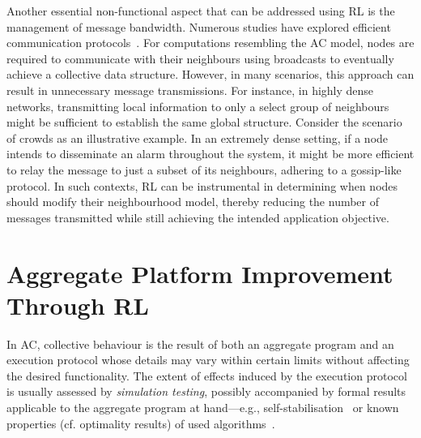{Another essential non-functional aspect that can be addressed using \ac{RL} is the management of message bandwidth. 
 Numerous studies have explored efficient communication protocols~\cite{DBLP:conf/nips/ZhangZL19, su2019cooperative}. 
 For computations resembling the AC model, nodes are required to communicate with their neighbours using broadcasts to eventually achieve a collective data structure. 
 However, in many scenarios, this approach can result in unnecessary message transmissions. 
 For instance, in highly dense networks, transmitting local information to only a select group of neighbours might be sufficient to establish the same global structure.
%
Consider the scenario of crowds as an illustrative example. 
 In an extremely dense setting, if a node intends to disseminate an alarm throughout the system, 
 it might be more efficient to relay the message to just a subset of its neighbours, 
 adhering to a gossip-like protocol.
In such contexts, \ac{RL} can be instrumental in determining 
 when nodes should modify their neighbourhood model, 
 thereby reducing the number of messages transmitted 
 while still achieving the intended application objective.
}
\section{Aggregate Platform Improvement Through \acl{RL}}\label{acsos2022:sec:contribution}
In \ac{AC}, collective behaviour 
 is the result of both
 an aggregate program
 and an execution protocol
 whose details may vary within certain limits
 without affecting the desired functionality.
%
The extent of effects induced by the execution protocol
 is usually assessed by \emph{simulation testing},
 possibly accompanied by formal results applicable to the aggregate program at hand---e.g., self-stabilisation~\cite{DBLP:journals/tomacs/ViroliABDP18}
  or known properties (cf. optimality results) of used algorithms~\cite{DBLP:conf/saso/AudritoCDV17,DBLP:journals/cee/AudritoCDPV21}.

